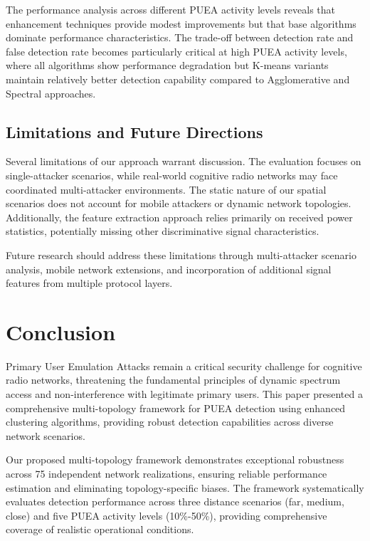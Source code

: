\documentclass[pdflatex,sn-mathphys-num]{sn-jnl}%
\theoremstyle{thmstyleone}
\theoremstyle{thmstyletwo}
\theoremstyle{thmstylethree}
\begin{document}
The performance analysis across different PUEA activity levels reveals that enhancement techniques provide modest improvements but that base algorithms dominate performance characteristics. The trade-off between detection rate and false detection rate becomes particularly critical at high PUEA activity levels, where all algorithms show performance degradation but K-means variants maintain relatively better detection capability compared to Agglomerative and Spectral approaches.


\subsection{Limitations and Future Directions}

Several limitations of our approach warrant discussion. The evaluation focuses on single-attacker scenarios, while real-world cognitive radio networks may face coordinated multi-attacker environments. The static nature of our spatial scenarios does not account for mobile attackers or dynamic network topologies. Additionally, the feature extraction approach relies primarily on received power statistics, potentially missing other discriminative signal characteristics.

Future research should address these limitations through multi-attacker scenario analysis, mobile network extensions, and incorporation of additional signal features from multiple protocol layers.

\section{Conclusion}

Primary User Emulation Attacks remain a critical security challenge for cognitive radio networks, threatening the fundamental principles of dynamic spectrum access and non-interference with legitimate primary users. This paper presented a comprehensive multi-topology framework for PUEA detection using enhanced clustering algorithms, providing robust detection capabilities across diverse network scenarios.

Our proposed multi-topology framework demonstrates exceptional robustness across 75 independent network realizations, ensuring reliable performance estimation and eliminating topology-specific biases. The framework systematically evaluates detection performance across three distance scenarios (far, medium, close) and five PUEA activity levels (10\%-50\%), providing comprehensive coverage of realistic operational conditions.
\end{document}
